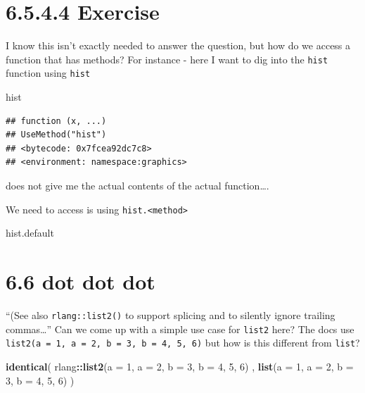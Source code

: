 \documentclass[]{book}
\newenvironment{Shaded}{\begin{snugshade}}{\end{snugshade}}
\newcommand{\DataTypeTok}[1]{\textcolor[rgb]{0.13,0.29,0.53}{#1}}
\newcommand{\DecValTok}[1]{\textcolor[rgb]{0.00,0.00,0.81}{#1}}
\newcommand{\KeywordTok}[1]{\textcolor[rgb]{0.13,0.29,0.53}{\textbf{#1}}}
\newcommand{\NormalTok}[1]{#1}
\newcommand{\OperatorTok}[1]{\textcolor[rgb]{0.81,0.36,0.00}{\textbf{#1}}}
\begin{document}
\hypertarget{exercise-3}{%
\section*{6.5.4.4 Exercise}\label{exercise-3}}

I know this isn't exactly needed to answer the question, but how do we access a function that has methods? For instance - here I want to dig into the \texttt{hist} function using \texttt{hist}

\begin{Shaded}
\begin{Highlighting}[]
\NormalTok{hist}
\end{Highlighting}
\end{Shaded}

\begin{verbatim}
## function (x, ...) 
## UseMethod("hist")
## <bytecode: 0x7fcea92dc7c8>
## <environment: namespace:graphics>
\end{verbatim}

does not give me the actual contents of the actual function\ldots{}.

We need to access is using \texttt{hist.\textless{}method\textgreater{}}

\begin{Shaded}
\begin{Highlighting}[]
\NormalTok{hist.default}
\end{Highlighting}
\end{Shaded}

\hypertarget{dot-dot-dot}{%
\section*{6.6 dot dot dot}\label{dot-dot-dot}}

``(See also \texttt{rlang::list2()} to support splicing and to silently ignore trailing commas\ldots{}'' Can we come up with a simple use case for \texttt{list2} here? The docs use \texttt{list2(a\ =\ 1,\ a\ =\ 2,\ b\ =\ 3,\ b\ =\ 4,\ 5,\ 6)} but how is this different from \texttt{list}?

\begin{Shaded}
\begin{Highlighting}[]
\KeywordTok{identical}\NormalTok{(}
\NormalTok{  rlang}\OperatorTok{::}\KeywordTok{list2}\NormalTok{(}\DataTypeTok{a =} \DecValTok{1}\NormalTok{, }\DataTypeTok{a =} \DecValTok{2}\NormalTok{, }\DataTypeTok{b =} \DecValTok{3}\NormalTok{, }\DataTypeTok{b =} \DecValTok{4}\NormalTok{, }\DecValTok{5}\NormalTok{, }\DecValTok{6}\NormalTok{) ,}
  \KeywordTok{list}\NormalTok{(}\DataTypeTok{a =} \DecValTok{1}\NormalTok{, }\DataTypeTok{a =} \DecValTok{2}\NormalTok{, }\DataTypeTok{b =} \DecValTok{3}\NormalTok{, }\DataTypeTok{b =} \DecValTok{4}\NormalTok{, }\DecValTok{5}\NormalTok{, }\DecValTok{6}\NormalTok{)}
\NormalTok{)}
\end{Highlighting}
\end{Shaded}
\end{document}
